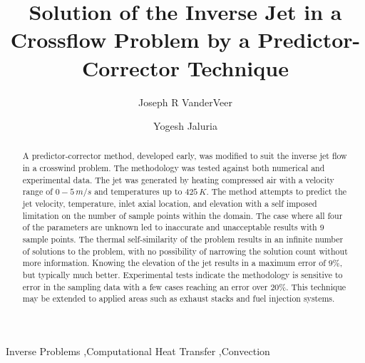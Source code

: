 \documentclass[preprint,12pt]{elsarticle}
\begin{document}
\begin{frontmatter}
\title{Solution of the Inverse Jet in a Crossflow Problem by a Predictor-Corrector Technique}

\author{Joseph R VanderVeer}
\author{Yogesh Jaluria}

\address{Department of Mechanical and Aerospace Engineering: Rutgers University, 98 Brett Rd, Piscataway NJ, 08854}



\begin{abstract}
A predictor-corrector method, developed early, was modified to suit the inverse jet flow in a crosswind problem.  The methodology was tested against both numerical and experimental data.  The jet was generated by heating compressed air with a velocity range of $0-5\,m/s$ and temperatures up to $425\,K$.  The method attempts to predict the jet velocity, temperature, inlet axial location, and elevation with a self imposed limitation on the number of sample points within the domain.  The case where all four of the parameters are unknown led to inaccurate and unacceptable results with 9 sample points.  The thermal self-similarity of the problem results in an infinite number of solutions to the problem, with no possibility of narrowing the solution count without more information.  Knowing the elevation of the jet results in a maximum error of $9\%$, but typically much better.  Experimental tests indicate the methodology is sensitive to error in the sampling data with a few cases reaching an error over $20\%$.  This technique may be extended to applied areas such as exhaust stacks and fuel injection systems.

\end{abstract}
\begin{keyword}
Inverse Problems \sep Computational Heat Transfer \sep Convection
\end{keyword}
\end{frontmatter}


\newlength\figureheight 
\newlength\figurewidth 
	
	
	
\end{document}
